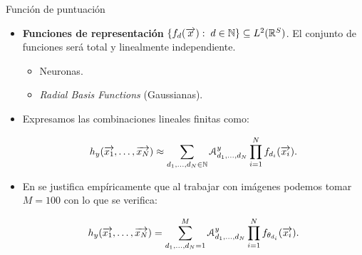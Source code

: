 \begin{frame}{Función de puntuación}

	\begin{itemize}
		\item \textbf{Funciones de representación} $\{ f_d(\overrightarrow{x}): \; d \in \mathbb{N} \} \subseteq L^2(\mathbb{R}^S)$. El conjunto de funciones será total y linealmente independiente.
		      \begin{itemize}
			      \item Neuronas.
			      \item \textit{Radial Basis Functions} (Gaussianas).
		      \end{itemize}
		\item Expresamos las combinaciones lineales finitas como:

		      \begin{equation} \label{eq:hipotesis_en_general}
			      h_y(\overrightarrow{x_1}, \ldots, \overrightarrow{x_N}) \approx \sum_{d_1, \ldots, d_N \in \mathbb{N}} \mathcal{A}^y_{d_1, \ldots, d_N} \prod_{i = 1}^N f_{d_i}(\overrightarrow{x_i}).
		      \end{equation}
		\item En  se justifica empíricamente que al trabajar con imágenes podemos tomar $M=100$ con lo que se verifica:

		      \begin{equation} \label{eq:puntuacion_general}
			      h_y(\overrightarrow{x_1}, \ldots, \overrightarrow{x_N}) = \sum_{d_1, \ldots, d_N = 1}^{M} \mathcal{A}^y_{d_1, \ldots, d_N} \prod_{i = 1}^N f_{\theta_{d_i}}(\overrightarrow{x_i}).
		      \end{equation}
	\end{itemize}

\end{frame}


